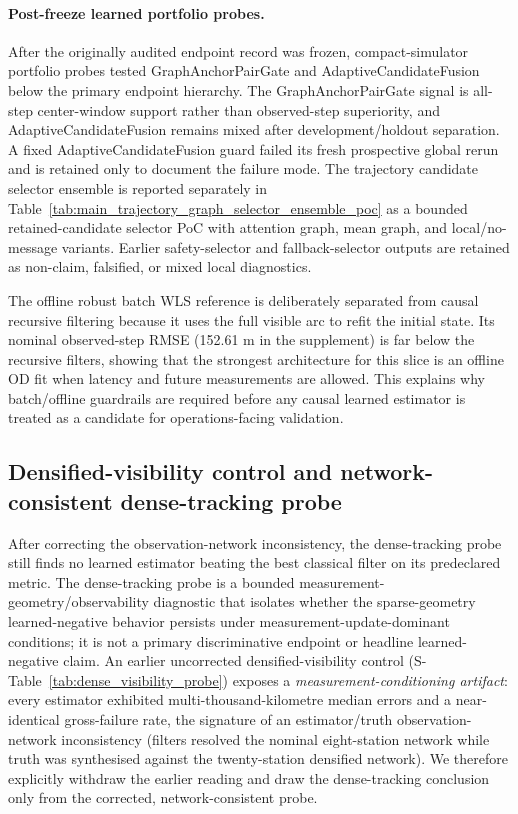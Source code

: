 \documentclass{article}
\begin{document}
\paragraph{Post-freeze learned portfolio probes.}
After the originally audited endpoint record was frozen, compact-simulator portfolio probes tested GraphAnchorPairGate and AdaptiveCandidateFusion below the primary endpoint hierarchy. The GraphAnchorPairGate signal is all-step center-window support rather than observed-step superiority, and AdaptiveCandidateFusion remains mixed after development/holdout separation. A fixed AdaptiveCandidateFusion guard failed its fresh prospective global rerun and is retained only to document the failure mode. The trajectory candidate selector ensemble is reported separately in Table~\ref{tab:main_trajectory_graph_selector_ensemble_poc} as a bounded retained-candidate selector PoC with attention graph, mean graph, and local/no-message variants. Earlier safety-selector and fallback-selector outputs are retained as non-claim, falsified, or mixed local diagnostics.

The offline robust batch WLS reference is deliberately separated from causal recursive filtering because it uses the full visible arc to refit the initial state. Its nominal observed-step RMSE (152.61 m in the supplement) is far below the recursive filters, showing that the strongest architecture for this slice is an offline OD fit when latency and future measurements are allowed. This explains why batch/offline guardrails are required before any causal learned estimator is treated as a candidate for operations-facing validation.

\subsection{Densified-visibility control and network-consistent dense-tracking probe}
After correcting the observation-network inconsistency, the dense-tracking probe still finds no learned estimator beating the best classical filter on its predeclared metric. The dense-tracking probe is a bounded measurement-geometry/observability diagnostic that isolates whether the sparse-geometry learned-negative behavior persists under measurement-update-dominant conditions; it is not a primary discriminative endpoint or headline learned-negative claim.
An earlier uncorrected densified-visibility control (S-Table~\ref{tab:dense_visibility_probe}) exposes a \emph{measurement-conditioning artifact}: every estimator exhibited multi-thousand-kilometre median errors and a near-identical gross-failure rate, the signature of an estimator/truth observation-network inconsistency (filters resolved the nominal eight-station network while truth was synthesised against the twenty-station densified network). We therefore explicitly withdraw the earlier reading and draw the dense-tracking conclusion only from the corrected, network-consistent probe.
\end{document}

